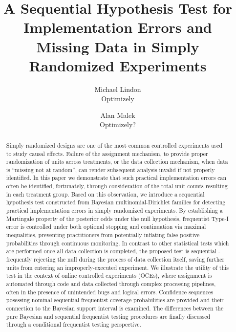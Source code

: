 \documentclass[11pt]{article}
\begin{document}
\vspace{-1in}
\title{A Sequential Hypothesis Test for Implementation Errors and Missing Data in Simply Randomized Experiments}
\author{\Large Michael Lindon \\ Optimizely \and Alan Malek \\ Optimizely?}
\maketitle 
\begin{abstract}
  Simply randomized designs are one of the most common controlled experiments used to study causal effects.
  Failure of the assignment mechanism, to provide proper randomization of units across treatments, or the data collection mechanism, when data is ``missing not at random'', can render subsequent analysis invalid if not properly identified. In this paper we demonstrate that such practical implementation errors can often be identified, fortunately, through consideration of the total unit counts resulting in each treatment group.
  Based on this observation, we introduce a sequential hypothesis test constructed from Bayesian multinomial-Dirichlet families for detecting practical implementation errors in simply randomized experiments. By establishing a Martingale property of the posterior odds under the null hypothesis, frequentist Type-I error is controlled under both optional stopping and continuation via maximal inequalities, preventing practitioners from potentially inflating false positive probabilities through continuous monitoring.
  In contrast to other statistical tests which are performed once all data collection is completed, the proposed test is sequential - frequently rejecting the null during the process of data collection itself, saving further units from entering an improperly-executed experiment.
  We illustrate the utility of this test in the context of online controlled experiments (OCEs), where assignment is automated through code and data collected through complex processing pipelines, often in the presence of unintended bugs and logical errors. Confidence sequences posessing nominal sequential frequentist coverage probabilities are provided and their connection to the Bayesian support interval is examined. The differences between the pure Bayesian and sequential frequentist testing procedures are finally discussed through a conditional frequentist testing perspective.  
\end{abstract}
\end{document}
